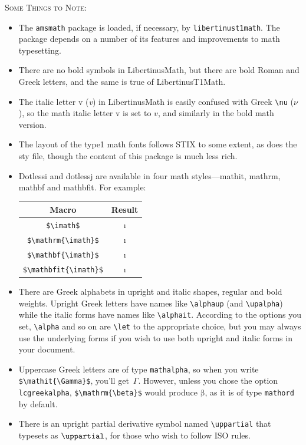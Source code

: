 \documentclass{article}
\begin{document}
\textsc{Some Things to Note:}
\begin{itemize}
\item The {\tt amsmath} package is loaded, if necessary, by {\tt libertinust1math}. The package depends on a number of its features and improvements to math typesetting.
\item
There are no bold symbols in LibertinusMath, but there are bold Roman and Greek letters, and the same is true of LibertinusT1Math.
\item The italic letter v (\emph{v}) in LibertinusMath is easily confused with Greek \verb|\nu| ($\nu$), so the math italic letter v is set to $v$, and similarly in the bold math version.
\item The layout of the type1 math fonts follows STIX to some extent, as does the sty file, though the content of this package is much less rich.
\item Dotlessi and dotlessj are available in four math styles---mathit, mathrm, mathbf and mathbfit. For example:
\begin{center}
  \begin{tabular}{@{} cc @{}}
    \toprule
    Macro & Result \\ 
    \midrule
   \verb|$\imath$| & $\imath$ \\ 
   \verb|$\mathrm{\imath}$| & $\mathrm{\imath}$ \\ 
    \verb|$\mathbf{\imath}$| & $\mathbf{\imath}$ \\ 
    \verb|$\mathbfit{\imath}$| & $\mathbfit{\imath}$ \\ 
    \bottomrule
  \end{tabular}
\end{center}
\item There are Greek alphabets in upright and italic shapes, regular and bold weights. Upright Greek letters have names like \verb|\alphaup| (and \verb|\upalpha|) while the italic forms have names like \verb|\alphait|. According to the options you set, \verb|\alpha| and so on are \verb|\let| to the appropriate choice, but you may always use the underlying forms if you wish to use both upright and italic forms in your document.
\item Uppercase Greek letters are of type {\tt mathalpha}, so when you write \verb|$\mathit{\Gamma}$|, you'll get~$\mathit{\Gamma}$. However, unless you chose the option {\tt lcgreekalpha}, \verb|$\mathrm{\beta}$| would produce $\mathrm{\beta}$, as it is of type {\tt mathord} by default.
\item There is an upright partial derivative symbol named \verb|\uppartial| that typesets as $\uppartial$, for those who wish to follow ISO rules.

\end{itemize}
\end{document}
